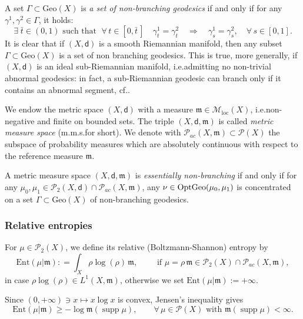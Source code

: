 \documentclass[11pt,a4paper]{article}
\theoremstyle{plain}
\theoremstyle{definition}
\theoremstyle{remark}
\numberwithin{equation}{section}
\DeclareMathOperator{\supp}{\mathrm{supp}}
\newcommand{\Geo}{\mathrm{Geo}}
\newcommand{\OptGeo}{{\rm OptGeo}}
\newcommand{\Ent}{\mathrm{Ent}}
\newcommand{\loc}{\mathrm{loc}}
\newcommand{\Prob}{\mathcal{P}}
\newcommand{\sM}{\mathscr{M}}
\newcommand{\mm}{\mathfrak m}
\newcommand{\sfd}{\mathsf d}
\begin{document}
A set $\Gamma \subset \Geo(X)$ is  \emph{a set of non-branching geodesics} if and only if for any $\gamma^{1},\gamma^{2} \in \Gamma$, it holds:
\begin{equation}
\exists \;  \bar t\in (0,1) \text{ such that } \; \forall\, t \in [0, \bar t\,] \quad  \gamma_{t}^{1} = \gamma_{t}^{2}   
\quad 
\Longrightarrow 
\quad 
\gamma^{1}_{s} = \gamma^{2}_{s}, \quad \forall\, s \in [0,1].
\end{equation}
It is clear that if $(X,\sfd)$ is a smooth Riemannian manifold, then any subset $\Gamma \subset \Geo(X)$ is a set of non branching geodesics. This is true, more generally, if $(X,\sfd)$ is an ideal sub-Riemannian manifold, i.e.\@ admitting no non-trivial abnormal geodesics: in fact, a sub-Riemannian geodesic can branch only if it contains an abnormal segment, cf.\@ \cite{MR-branching}.
\medskip

We endow the metric space $(X,\sfd)$ with a  measure $\mm\in \sM_{\loc}(X)$, i.e.\@ non-negative and finite on bounded sets.  The triple $(X,\sfd,\mm)$ is called \emph{metric measure space} (m.m.s.\@ for short). We denote with 
 $\Prob_{ac}(X,\mm)\subset \Prob(X)$ the subspace of probability measures  which are absolutely continuous  with respect to the reference measure $\mm$. 

A metric measure space $(X,\sfd, \mm)$ is \emph{essentially non-branching} if and only if for any $\mu_{0},\mu_{1} \in \Prob_{2}(X,\sfd)\cap \Prob_{ac}(X,\mm)$, any  $\nu\in \OptGeo(\mu_{0},\mu_{1})$ is concentrated on a set $\Gamma\subset \Geo(X)$ of non-branching geodesics. 


\subsubsection{Relative entropies}\label{sec:entropies}

For $\mu \in \mathcal{P}_{2}(X)$, we define its relative (Boltzmann-Shannon) entropy  by
\begin{equation}\label{def:Ent}
\Ent(\mu|\mm): = \int_{X} \rho \log(\rho) \, \mm,\qquad  \text{ if $\mu = \rho \, \mm\in \Prob_{2}(X)\cap \Prob_{ac}(X,\mm)$},
\end{equation}
in case  $\rho\log(\rho)\in L^{1}(X,\mm)$,  otherwise we set $\Ent(\mu|\mm) := +\infty$.

Since $(0,+\infty)\ni x\mapsto x\log x$ is convex, Jensen's inequality gives
\begin{equation}\label{eq:jensenEnt}
\Ent(\mu|\mm)\geq -\log \mm(\supp \mu), \qquad  \forall\, \mu\in  \mathcal{P}(X) \text{ with } \mm(\supp \mu)<\infty.
\end{equation}
\end{document}
